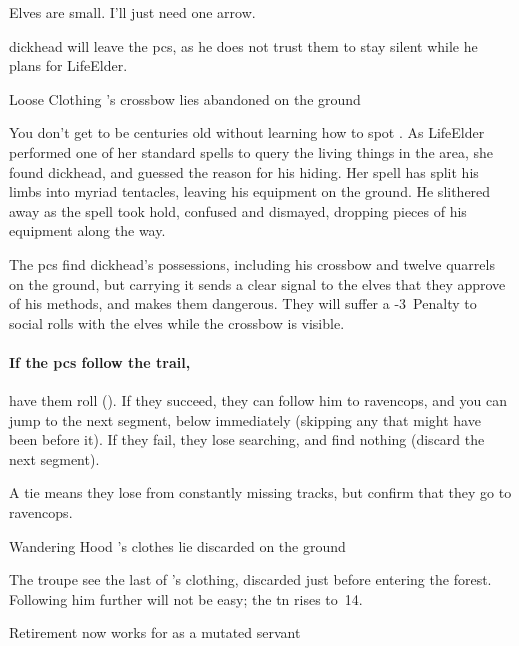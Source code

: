 \begin{multicols}{2}
\begin{speechtext}
  Elves are small.
  I'll just need one arrow.
\end{speechtext}

\Gls{dickhead} will leave the \glspl{pc}, as he does not trust them to stay silent while he plans  for \gls{LifeElder}.

{Loose Clothing}%
{'s crossbow lies abandoned on the ground}%

\begin{exampletext}
  You don't get to be centuries old without learning how to spot .
  As \gls{LifeElder} performed one of her standard spells to query the living things in the area, she found \gls{dickhead}, and guessed the reason for his hiding.
  Her spell has split his limbs into myriad tentacles, leaving his equipment on the ground.
  He slithered away as the spell took hold, confused and dismayed, dropping pieces of his equipment along the way.
\end{exampletext}

The \glspl{pc} find \gls{dickhead}'s possessions, including his \gls{crossbow} and twelve quarrels on the ground, but carrying it sends a clear signal to the elves that they approve of his methods, and makes them dangerous.
They will suffer a -3~Penalty to social rolls with the elves while the \gls{crossbow} is visible.

\paragraph{If the \glspl{pc} follow the trail,}
have them roll  (\tn[10]).
If they succeed, they can follow him to \gls{ravencops}, and you can jump to the next \gls{segment}, below immediately (skipping any that might have been before it).
If they fail, they lose  searching, and find nothing (discard the next \gls{segment}).

A tie means they lose  from constantly missing tracks, but confirm that they go to \gls{ravencops}.

{Wandering Hood}%
{'s clothes lie discarded on the ground}%

The troupe see the last of 's clothing, discarded just before entering the forest.
Following him further will not be easy; the \gls{tn} rises to~14.

{Retirement}%
{ now works for  as a mutated servant}%


\end{multicols}
